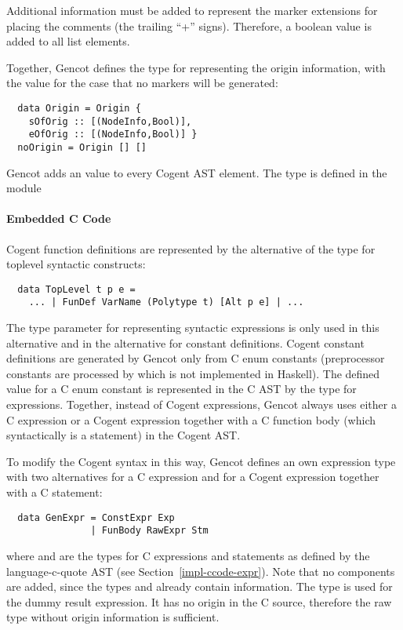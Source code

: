 Additional information must be added to represent the marker extensions for placing the comments (the trailing ``+'' signs).
Therefore, a boolean value is added to all list elements.

Together, Gencot defines the type  for representing the origin information, with the value 
for the case that no markers will be generated:
\begin{verbatim}
  data Origin = Origin { 
    sOfOrig :: [(NodeInfo,Bool)], 
    eOfOrig :: [(NodeInfo,Bool)] } 
  noOrigin = Origin [] []
\end{verbatim}
Gencot adds an  value to every Cogent AST element. The type  is defined in the module 

\paragraph{Embedded C Code}

Cogent function definitions are represented by the  alternative of the type for toplevel syntactic constructs:

\begin{verbatim}
  data TopLevel t p e = 
    ... | FunDef VarName (Polytype t) [Alt p e] | ...
\end{verbatim}
The type parameter  for representing syntactic expressions is only used in this alternative and in the alternative
for constant definitions. Cogent constant definitions are generated by Gencot only from C enum constants (preprocessor
constants are processed by  which is not implemented in Haskell). The defined value for a C enum
constant is represented in the C AST by the type for expressions. Together, instead of Cogent expressions, Gencot always
uses either a C expression or a Cogent expression together with a C function body (which syntactically is a statement) 
in the Cogent AST. 

To modify the Cogent syntax in this way, Gencot defines an own expression type with two alternatives for a C expression 
and for a Cogent expression together with a C statement:
\begin{verbatim}
  data GenExpr = ConstExpr Exp
               | FunBody RawExpr Stm
\end{verbatim}
where  and  are the types for C expressions and statements as defined by the language-c-quote AST 
(see Section~\ref{impl-ccode-expr}). Note that no  components are added, since the types  and 
 already contain  information. The type  is used for the dummy result expression.
It has no origin in the C source, therefore the raw type without origin information is sufficient. 

